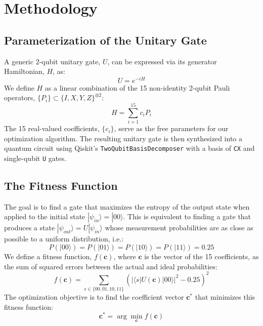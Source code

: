 \documentclass[11pt, a4paper]{article}
\begin{document}
\section{Methodology}
\subsection{Parameterization of the Unitary Gate}
A generic 2-qubit unitary gate, $U$, can be expressed via its generator Hamiltonian, $H$, as:
\begin{equation}
    U = e^{-iH}
\end{equation}
We define $H$ as a linear combination of the 15 non-identity 2-qubit Pauli operators, $\{P_i\} \subset \{I, X, Y, Z\}^{\otimes 2}$:
\begin{equation}
    H = \sum_{i=1}^{15} c_i P_i
\end{equation}
The 15 real-valued coefficients, $\{c_i\}$, serve as the free parameters for our optimization algorithm. The resulting unitary gate is then synthesized into a quantum circuit using Qiskit's \texttt{TwoQubitBasisDecomposer} with a basis of \texttt{CX} and single-qubit \texttt{U} gates.

\subsection{The Fitness Function}
The goal is to find a gate that maximizes the entropy of the output state when applied to the initial state $|\psi_{in}\rangle = |00\rangle$. This is equivalent to finding a gate that produces a state $|\psi_{out}\rangle = U|\psi_{in}\rangle$ whose measurement probabilities are as close as possible to a uniform distribution, i.e.:
\begin{equation}
    P(|00\rangle) = P(|01\rangle) = P(|10\rangle) = P(|11\rangle) = 0.25
\end{equation}
We define a fitness function, $f(\mathbf{c})$, where $\mathbf{c}$ is the vector of the 15 coefficients, as the sum of squared errors between the actual and ideal probabilities:
\begin{equation}
    f(\mathbf{c}) = \sum_{s \in \{00, 01, 10, 11\}} \left( |\langle s | U(\mathbf{c}) | 00 \rangle|^2 - 0.25 \right)^2
\end{equation}
The optimization objective is to find the coefficient vector $\mathbf{c}^*$ that minimizes this fitness function:
\begin{equation}
    \mathbf{c}^* = \arg\min_{\mathbf{c}} f(\mathbf{c})
\end{equation}
\end{document}
